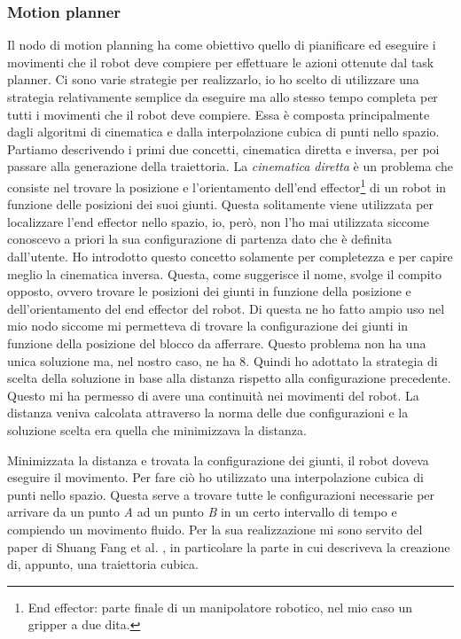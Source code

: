 \subsubsection{Motion planner}
\label{subsubsec:motionplanner}
Il nodo di motion planning ha come obiettivo quello di pianificare ed eseguire i movimenti che il robot deve compiere per effettuare le azioni ottenute dal task planner.
Ci sono varie strategie per realizzarlo, io ho scelto di utilizzare una strategia relativamente semplice da eseguire ma allo stesso tempo completa per tutti i movimenti che il robot deve compiere. Essa è composta principalmente dagli algoritmi di cinematica e  dalla interpolazione cubica di punti nello spazio.
Partiamo descrivendo i primi due concetti, cinematica diretta e inversa, per poi passare alla generazione della traiettoria.
La \textit{cinematica diretta} è un problema che consiste nel trovare la posizione e l'orientamento dell'end effector\footnote{End effector: parte finale di un manipolatore robotico, nel mio caso un gripper a due dita.} di un robot in funzione delle posizioni dei suoi giunti. 
Questa solitamente viene utilizzata per localizzare l'end effector nello spazio, io, però, non l'ho mai utilizzata siccome conoscevo a priori la sua configurazione di partenza dato che è definita dall'utente. Ho introdotto questo concetto solamente per completezza e per capire meglio la cinematica inversa.
Questa, come suggerisce il nome, svolge il compito opposto, ovvero trovare le posizioni dei giunti in funzione della posizione e dell'orientamento del end effector del robot.
Di questa ne ho fatto ampio uso nel mio nodo siccome mi permetteva di trovare la configurazione dei giunti in funzione della posizione del blocco da afferrare.
Questo problema non ha una unica soluzione ma, nel nostro caso, ne ha 8. Quindi ho adottato la strategia di scelta della soluzione in base alla distanza rispetto alla configurazione precedente. Questo mi ha permesso di avere una continuità nei movimenti del robot.
La distanza veniva calcolata attraverso la norma delle due configurazioni e la soluzione scelta era quella che minimizzava la distanza.

Minimizzata la distanza e trovata la configurazione dei giunti, il robot doveva eseguire il movimento. Per fare ciò ho utilizzato una interpolazione cubica di punti nello spazio. Questa serve a trovare tutte le configurazioni necessarie per arrivare da un punto \textit{A} ad un punto \textit{B} in un certo intervallo di tempo e compiendo un movimento fluido. 
Per la sua realizzazione mi sono servito del paper di Shuang Fang et al. \cite{8941347}, in particolare la parte in cui descriveva la creazione di, appunto, una traiettoria cubica.

